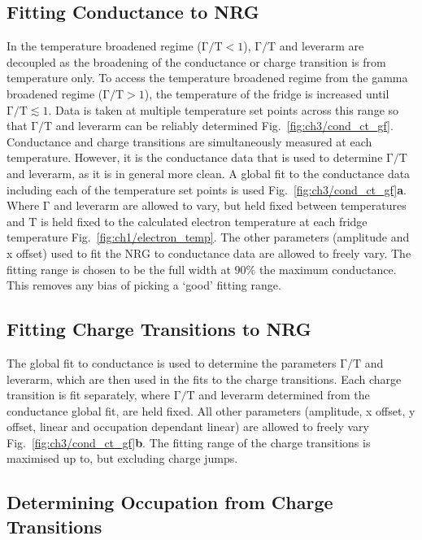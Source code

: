 \subsection{Fitting Conductance to NRG}
In the temperature broadened regime ($\mathrm{\Gamma/T} < 1$), $\mathrm{\Gamma/T}$ and leverarm are decoupled as the broadening of the conductance or charge transition is from temperature only. To access the temperature broadened regime from the gamma broadened regime ($\mathrm{\Gamma/T} > 1$), the temperature of the fridge is increased until $\mathrm{\Gamma/T} \lesssim 1$. Data is taken at multiple temperature set points across this range so that $\mathrm{\Gamma/T}$ and leverarm can be reliably determined Fig.~\ref{fig:ch3/cond_ct_gf}. Conductance and charge transitions are simultaneously measured at each temperature. However, it is the conductance data that is used to determine $\mathrm{\Gamma/T}$ and leverarm, as it is in general more clean. A global fit to the conductance data including each of the temperature set points is used Fig.~\ref{fig:ch3/cond_ct_gf}\textbf{a}. Where $\mathrm{\Gamma}$ and leverarm are allowed to vary, but held fixed between temperatures and $\mathrm{T}$ is held fixed to the calculated electron temperature at each fridge temperature Fig.~\ref{fig:ch1/electron_temp}. The other parameters (amplitude and x offset) used to fit the NRG to conductance data are allowed to freely vary.
The fitting range is chosen to be the full width at $90\%$ the maximum conductance. This removes any bias of picking a `good' fitting range. 

\subsection{Fitting Charge Transitions to NRG}
The global fit to conductance is used to determine the parameters $\mathrm{\Gamma/T}$ and leverarm, which are then used in the fits to the charge transitions. Each charge transition is fit separately, where $\mathrm{\Gamma/T}$ and leverarm determined from the conductance global fit, are held fixed. All other parameters (amplitude, x offset, y offset, linear and occupation dependant linear) are allowed to freely vary Fig.~\ref{fig:ch3/cond_ct_gf}\textbf{b}. The fitting range of the charge transitions is maximised up to, but excluding charge jumps.


\subsection{Determining Occupation from Charge Transitions}


